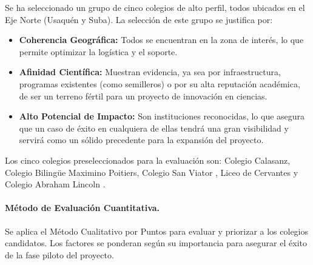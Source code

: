 Se ha seleccionado un grupo de cinco colegios de alto perfil, todos ubicados en el Eje Norte (Usaquén y Suba). La selección de este grupo se justifica por:
\begin{itemize}
    \item \textbf{Coherencia Geográfica:} Todos se encuentran en la zona de interés, lo que permite optimizar la logística y el soporte.
    \item \textbf{Afinidad Científica:} Muestran evidencia, ya sea por infraestructura, programas existentes (como semilleros) o por su alta reputación académica, de ser un terreno fértil para un proyecto de innovación en ciencias.
    \item \textbf{Alto Potencial de Impacto:} Son instituciones reconocidas, lo que asegura que un caso de éxito en cualquiera de ellas tendrá una gran visibilidad y servirá como un sólido precedente para la expansión del proyecto.
\end{itemize}
Los cinco colegios preseleccionados para la evaluación son: Colegio Calasanz, Colegio Bilingüe Maximino Poitiers, Colegio San Viator \cite{sanviator_web}, Liceo de Cervantes \cite{liceocervantes_web} y Colegio Abraham Lincoln \cite{abrahamlincoln_web}.

\paragraph{Método de Evaluación Cuantitativa.}
Se aplica el Método Cualitativo por Puntos para evaluar y priorizar a los colegios candidatos. Los factores se ponderan según su importancia para asegurar el éxito de la fase piloto del proyecto.

